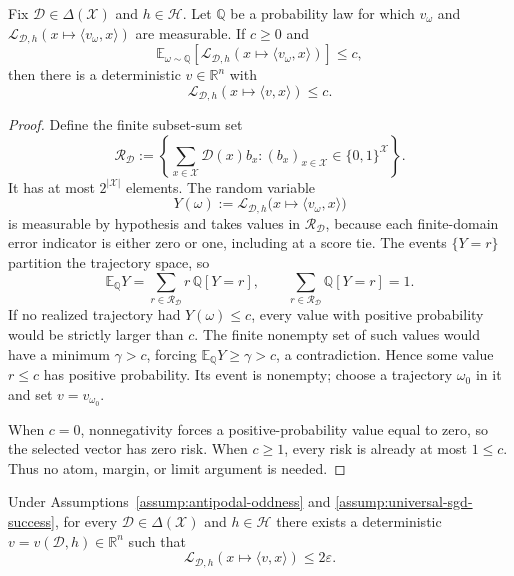 \begin{lemma}
\label{lem:step-003-finite-extraction}
Fix $\mathcal D\in\Delta(\mathcal X)$ and $h\in\mathcal H$.  Let
$\mathbb Q$ be a probability law for which $v_\omega$ and
$\mathcal L_{\mathcal D,h}(x\mapsto\langle v_\omega,x\rangle)$ are
measurable.  If $c\geq0$ and
\[
\mathbb E_{\omega\sim\mathbb Q}
 \left[\mathcal L_{\mathcal D,h}(x\mapsto\langle v_\omega,x\rangle)\right]
\leq c,
\]
then there is a deterministic $v\in\mathbb R^n$ with
\[
\mathcal L_{\mathcal D,h}(x\mapsto\langle v,x\rangle)\leq c.
\]
\end{lemma}

\begin{proof}
Define the finite subset-sum set
\[
 \mathscr R_{\mathcal D}:=
 \left\{\sum_{x\in\mathcal X}\mathcal D(x)b_x:
 (b_x)_{x\in\mathcal X}\in\{0,1\}^{\mathcal X}\right\}.
\]
It has at most $2^{|\mathcal X|}$ elements.  The random variable
\[
Y(\omega):=\mathcal L_{\mathcal D,h}
 \bigl(x\mapsto\langle v_\omega,x\rangle\bigr)
\]
is measurable by hypothesis and takes values in $\mathscr R_{\mathcal D}$,
because each finite-domain error indicator is either zero or one, including
at a score tie.  The events $\{Y=r\}$ partition the trajectory space, so
\[
\mathbb E_{\mathbb Q}Y
=\sum_{r\in\mathscr R_{\mathcal D}}r\,\mathbb Q[Y=r],
\qquad
\sum_{r\in\mathscr R_{\mathcal D}}\mathbb Q[Y=r]=1.
\]
If no realized trajectory had $Y(\omega)\leq c$, every value with positive
probability would be strictly larger than $c$.  The finite nonempty set of
such values would have a minimum $\gamma>c$, forcing
$\mathbb E_{\mathbb Q}Y\geq\gamma>c$, a contradiction.  Hence some value
$r\leq c$ has positive probability.  Its event is nonempty; choose a
trajectory $\omega_0$ in it and set $v=v_{\omega_0}$.

When $c=0$, nonnegativity forces a positive-probability value equal to zero,
so the selected vector has zero risk.  When $c\geq1$, every risk is already
at most $1\leq c$.  Thus no atom, margin, or limit argument is needed.
\end{proof}

\begin{proposition}
\label{prop:step-003-approximate-separator}
Under Assumptions~\ref{assump:antipodal-oddness} and
\ref{assump:universal-sgd-success}, for every
$\mathcal D\in\Delta(\mathcal X)$ and $h\in\mathcal H$ there exists a
deterministic $v=v(\mathcal D,h)\in\mathbb R^n$ such that
\[
\mathcal L_{\mathcal D,h}(x\mapsto\langle v,x\rangle)\leq2\varepsilon.
\]
\end{proposition}

